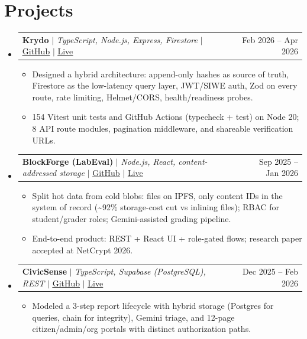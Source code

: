 \documentclass[letterpaper,11pt]{article}
\makeatletter
\newcommand{\resumeItem}[1]{
  \item\small{
    {#1 \vspace{-5pt}}
  }
}
\newcommand{\resumeProjectHeading}[2]{
  \item
    \begin{tabular*}{0.97\textwidth}{l@{\extracolsep{\fill}}r}
      \small#1 & #2 \\
    \end{tabular*}\vspace{-9pt}
}
\newcommand{\resumeSubHeadingListStart}{\begin{itemize}[leftmargin=0.15in, label={}]}
\newcommand{\resumeSubHeadingListEnd}{\end{itemize}}
\newcommand{\resumeItemListStart}{\begin{itemize}}
\newcommand{\resumeItemListEnd}{\end{itemize}\vspace{-10pt}}
\makeatother
\begin{document}
\section{Projects}
  \resumeSubHeadingListStart
    \resumeProjectHeading
      {\textbf{Krydo} $|$ \emph{TypeScript, Node.js, Express, Firestore} $|$ \href{https://github.com/nishant-uxs/krydo}{\underline{GitHub}} $|$ \href{https://krydo.onrender.com}{\underline{Live}}}{Feb 2026 -- Apr 2026}
      \resumeItemListStart
        \resumeItem{Designed a hybrid architecture: append-only hashes as source of truth, Firestore as the low-latency query layer, JWT/SIWE auth, Zod on every route, rate limiting, Helmet/CORS, health/readiness probes.}
        \resumeItem{154 Vitest unit tests and GitHub Actions (typecheck + test) on Node 20; 8 API route modules, pagination middleware, and shareable verification URLs.}
      \resumeItemListEnd
    \resumeProjectHeading
      {\textbf{BlockForge (LabEval)} $|$ \emph{Node.js, React, content-addressed storage} $|$ \href{https://github.com/nishant-uxs/labeval}{\underline{GitHub}} $|$ \href{https://blockchain-labeval.onrender.com}{\underline{Live}}}{Sep 2025 -- Jan 2026}
      \resumeItemListStart
        \resumeItem{Split hot data from cold blobs: files on IPFS, only content IDs in the system of record (\textasciitilde{}92\% storage-cost cut vs inlining files); RBAC for student/grader roles; Gemini-assisted grading pipeline.}
        \resumeItem{End-to-end product: REST + React UI + role-gated flows; research paper accepted at NetCrypt 2026.}
      \resumeItemListEnd
    \resumeProjectHeading
      {\textbf{CivicSense} $|$ \emph{TypeScript, Supabase (PostgreSQL), REST} $|$ \href{https://github.com/nishant-uxs/CivicSense}{\underline{GitHub}} $|$ \href{https://civic-sense-six.vercel.app}{\underline{Live}}}{Dec 2025 -- Feb 2026}
      \resumeItemListStart
        \resumeItem{Modeled a 3-step report lifecycle with hybrid storage (Postgres for queries, chain for integrity), Gemini triage, and 12-page citizen/admin/org portals with distinct authorization paths.}
      \resumeItemListEnd
  \resumeSubHeadingListEnd
\end{document}
